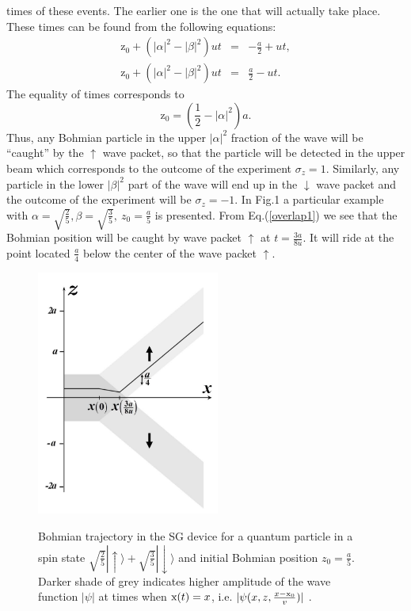 \documentclass[12pt,preprint,tightenlines]{elsarticle}
\begin{document}
times of these events. The earlier one  is the one that
will actually take place. These times can be found from the following
equations:
\begin{eqnarray}
\mathrm{z}_{0}+\left(|\alpha|^{2}-|\beta|^{2}\right)ut & = & -\frac{a}{2}+ut,\label{overlap1}\\
\mathrm{z}_{0}+\left(|\alpha|^{2}-|\beta|^{2}\right)ut & = & \frac{a}{2}-ut.
\end{eqnarray}
 The equality of times corresponds to
 \begin{equation}
\mathrm{z}_{0}=\left(\frac{1}{2}-|\alpha|^{2}\right)a.
\end{equation}
 Thus, any Bohmian particle in the upper $|\alpha|^{2}$ fraction of
the wave will be ``caught'' by the $\uparrow$ wave packet, so that the
particle will be detected in the upper beam which corresponds to the
outcome of the experiment $\sigma_{z}=1$. Similarly, any particle
in the lower $|\beta|^{2}$ part of the wave will end up in the
$\downarrow$ wave packet and the outcome of the experiment will be $\sigma_{z}=-1$.
In Fig.1 a particular example with $\alpha=\sqrt{\frac{2}{5}},\beta=\sqrt{\frac{3}{5}},~z_{0}=\frac{a}{5}$
is presented. From Eq.(\ref{overlap1}) we see that the Bohmian position
will be caught by wave packet $\uparrow$ at $t=\frac{{3a}}{{8u}}$. It will
ride at the point located $\frac{a}{4}$ below the center of the wave
packet $\uparrow$.


\begin{figure}[t]
  \includegraphics[width=6cm]{1.pdf}\\
  \vspace {-5pt}
    \caption{Bohmian trajectory in the SG device for a quantum particle in a spin state \break $\sqrt{\frac{2}{5}}|\uparrow\rangle+\sqrt{\frac{3}{5}}|\downarrow\rangle$ and initial Bohmian position $z_{0}=\frac{a}{5}$. Darker shade of grey indicates higher amplitude of the wave function $|\psi|$ at  times  when ${\rm x}(t)=x$, i.e. $|\psi(x,z,\frac{x-{\rm x}_0}{v})|$ .}
\end{figure}
\end{document}
